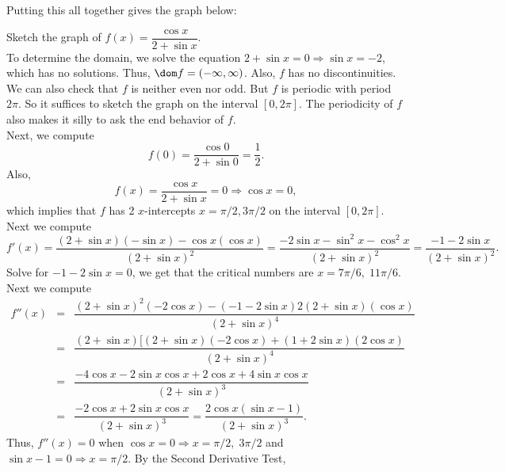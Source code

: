 \documentclass{book}
\begin{document}
\begin{Exam}
Putting this all together gives the graph below:

\begin{center}
\end{center}
\end{Exam}\vs

\begin{Exam} Sketch the graph of $f(x) = \dfrac{\cos x}{2+\sin x}$.\\

To determine the domain, we solve the equation $2+\sin x = 0 \Rightarrow \sin x = -2$, which has no solutions. Thus, $\dom f = (-\infty, \infty)$. Also, $f$ has no discontinuities. We can also check that $f$ is neither even nor odd. But $f$ is periodic with period $2\pi$. So it suffices to sketch the graph on the interval $[0,2\pi]$. The periodicity of $f$ also makes it silly to ask the end behavior of $f$.\\

Next, we compute \[f(0) = \dfrac{\cos 0}{2+\sin 0} = \dfrac{1}{2}.\] Also, \[f(x) = \dfrac{\cos x}{2+\sin x} = 0 \Rightarrow \cos x = 0,\] which implies that $f$ has 2 $x$-intercepts $x= \pi/2, 3\pi/2$ on the interval $[0,2\pi]$. \\

Next we compute \[f'(x) = \dfrac{(2+\sin x)(-\sin x) - \cos x(\cos x)}{(2+\sin x)^2} = \dfrac{-2\sin x -\sin^2 x - \cos^2 x}{(2+\sin x)^2} = \dfrac{-1 - 2\sin x}{(2+\sin x)^2}.\] Solve for $-1-2\sin x = 0$, we get that the critical numbers are $x = 7\pi/6,\; 11\pi/6$. \\

Next we compute 
\begin{eqnarray*}
f''(x) &=& \dfrac{(2+\sin x)^2(-2\cos x) - (-1-2\sin x)2(2+\sin x)(\cos x)}{(2+\sin x)^4}\\
& =& \dfrac{(2+\sin x)[(2+\sin x)(-2\cos x) + (1+2\sin x)(2\cos x)}{(2+\sin x)^4}\\
& =& \dfrac{-4\cos x - 2\sin x \cos x +2\cos x + 4\sin x \cos x}{(2+\sin x)^3}\\
&=& \dfrac{-2\cos x + 2\sin x \cos x}{(2+\sin x)^3} = \dfrac{2\cos x(\sin x - 1)}{(2+\sin x)^3}.
\end{eqnarray*} Thus, $f''(x) = 0$ when $\cos x = 0 \Rightarrow x = \pi/2,\; 3\pi/2$ and $\sin x -1 = 0 \Rightarrow x = \pi/2$. By the Second Derivative Test, 
\begin{center}
\begin{tabular}{c|c|c|c|c|c}


\end{tabular}
\end{center}
\end{Exam}
\end{document}
